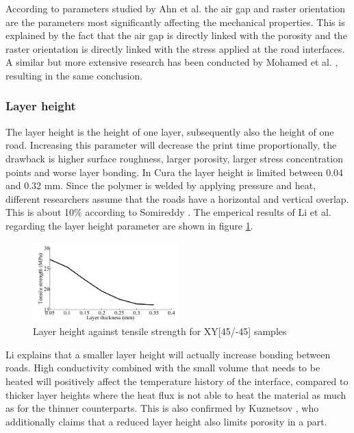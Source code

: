 According to parameters studied by Ahn et al. \cite{Ahn2002AnisotropicABS} the air gap and raster orientation are the parameters most significantly affecting the mechanical properties. This is explained by the fact that the air gap is directly linked with the porosity and the raster orientation is directly linked with the stress applied at the road interfaces.
A similar but more extensive research has been conducted by Mohamed et al. \cite{Mohamed2016EffectExperiment}, resulting in the same conclusion.

\subsubsection{Layer height}
The layer height is the height of one layer, subsequently also the height of one road. Increasing this parameter will decrease the print time proportionally, the drawback is higher surface roughness, larger porosity, larger stress concentration points and worse layer bonding. In Cura the layer height is limited between 0.04 and 0.32 mm. Since the polymer is welded by applying pressure and heat, different researchers assume that the roads have a horizontal and vertical overlap. This is about 10\% according to Somireddy \cite{Somireddy2017MechanicalMesostructure}.  The emperical results of Li et al. \cite{Li2017TheProperties} regarding the layer height parameter are shown in figure \ref{fig:Layerheigth}.

\begin{figure}[H]
    \centering
    \includegraphics[width=0.5\textwidth]{chapter_2/figures/Layerheight.PNG}
    \caption{Layer height against tensile strength for XY[45/-45] samples \cite{Li2017TheProperties}}
    \label{fig:Layerheigth}
\end{figure}

Li \cite{Li2017TheProperties} explains that a smaller layer height will actually increase bonding between roads. High conductivity combined with the small volume that needs to be heated will positively affect the temperature history of the interface, compared to thicker layer heights where the heat flux is not able to heat the material as much as for the thinner counterparts. This is also confirmed by Kuznetsov \cite{Kuznetsov2018StrengthProcess}, who additionally claims that a reduced layer height also limits porosity in a part.

